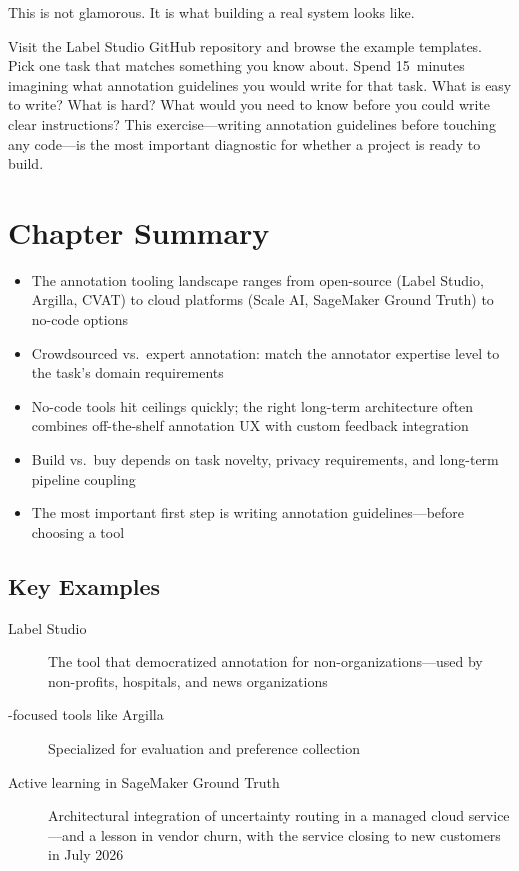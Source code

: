 This is not glamorous. It is what building a real \hitl system looks like.

\begin{trythis}
Visit the Label Studio GitHub repository and browse the example templates. Pick one task that matches something you know about. Spend 15~minutes imagining what annotation guidelines you would write for that task. What is easy to write? What is hard? What would you need to know before you could write clear instructions? This exercise---writing annotation guidelines before touching any code---is the most important diagnostic for whether a \hitl project is ready to build.
\end{trythis}

\section*{Chapter Summary}

\begin{keyconcept}
\begin{itemize}
  \item The annotation tooling landscape ranges from open-source (Label Studio, Argilla, CVAT) to cloud platforms (Scale AI, SageMaker Ground Truth) to no-code options
  \item Crowdsourced vs.\ expert annotation: match the annotator expertise level to the task's domain requirements
  \item No-code tools hit ceilings quickly; the right long-term architecture often combines off-the-shelf annotation UX with custom feedback integration
  \item Build vs.\ buy depends on task novelty, privacy requirements, and long-term pipeline coupling
  \item The most important first step is writing annotation guidelines---before choosing a tool
\end{itemize}
\end{keyconcept}

\subsection*{Key Examples}

\begin{description}
  \item[Label Studio] The tool that democratized annotation for non-\ml organizations---used by non-profits, hospitals, and news organizations
  \item[\rlhf-focused tools like Argilla] Specialized for \llm evaluation and preference collection
  \item[Active learning in SageMaker Ground Truth] Architectural integration of uncertainty routing in a managed cloud service---and a lesson in vendor churn, with the service closing to new customers in July 2026
\end{description}

